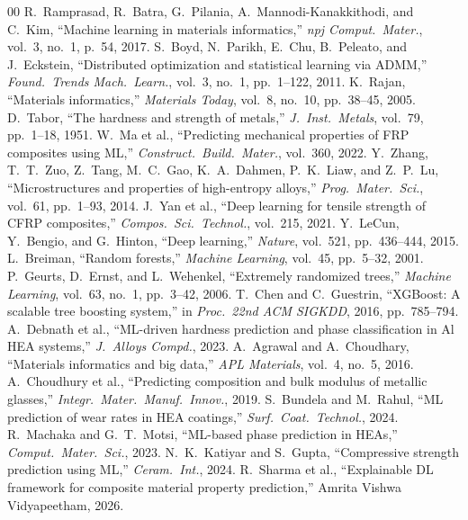 \documentclass[conference]{IEEEtran}
\begin{document}
\begin{thebibliography}{00}
 R.~Ramprasad, R.~Batra, G.~Pilania, A.~Mannodi-Kanakkithodi, and C.~Kim, ``Machine learning in materials informatics,'' \textit{npj Comput.\ Mater.}, vol.~3, no.~1, p.~54, 2017.
 S.~Boyd, N.~Parikh, E.~Chu, B.~Peleato, and J.~Eckstein, ``Distributed optimization and statistical learning via ADMM,'' \textit{Found.\ Trends Mach.\ Learn.}, vol.~3, no.~1, pp.~1--122, 2011.
 K.~Rajan, ``Materials informatics,'' \textit{Materials Today}, vol.~8, no.~10, pp.~38--45, 2005.
 D.~Tabor, ``The hardness and strength of metals,'' \textit{J.\ Inst.\ Metals}, vol.~79, pp.~1--18, 1951.
 W.~Ma et al., ``Predicting mechanical properties of FRP composites using ML,'' \textit{Construct.\ Build.\ Mater.}, vol.~360, 2022.
 Y.~Zhang, T.~T.~Zuo, Z.~Tang, M.~C.~Gao, K.~A.~Dahmen, P.~K.~Liaw, and Z.~P.~Lu, ``Microstructures and properties of high-entropy alloys,'' \textit{Prog.\ Mater.\ Sci.}, vol.~61, pp.~1--93, 2014.
 J.~Yan et al., ``Deep learning for tensile strength of CFRP composites,'' \textit{Compos.\ Sci.\ Technol.}, vol.~215, 2021.
 Y.~LeCun, Y.~Bengio, and G.~Hinton, ``Deep learning,'' \textit{Nature}, vol.~521, pp.~436--444, 2015.
 L.~Breiman, ``Random forests,'' \textit{Machine Learning}, vol.~45, pp.~5--32, 2001.
 P.~Geurts, D.~Ernst, and L.~Wehenkel, ``Extremely randomized trees,'' \textit{Machine Learning}, vol.~63, no.~1, pp.~3--42, 2006.
 T.~Chen and C.~Guestrin, ``XGBoost: A scalable tree boosting system,'' in \textit{Proc.\ 22nd ACM SIGKDD}, 2016, pp.~785--794.
 A.~Debnath et al., ``ML-driven hardness prediction and phase classification in Al HEA systems,'' \textit{J.\ Alloys Compd.}, 2023.
 A.~Agrawal and A.~Choudhary, ``Materials informatics and big data,'' \textit{APL Materials}, vol.~4, no.~5, 2016.
 A.~Choudhury et al., ``Predicting composition and bulk modulus of metallic glasses,'' \textit{Integr.\ Mater.\ Manuf.\ Innov.}, 2019.
 S.~Bundela and M.~Rahul, ``ML prediction of wear rates in HEA coatings,'' \textit{Surf.\ Coat.\ Technol.}, 2024.
 R.~Machaka and G.~T.~Motsi, ``ML-based phase prediction in HEAs,'' \textit{Comput.\ Mater.\ Sci.}, 2023.
 N.~K.~Katiyar and S.~Gupta, ``Compressive strength prediction using ML,'' \textit{Ceram.\ Int.}, 2024.
 R.~Sharma et al., ``Explainable DL framework for composite material property prediction,'' Amrita Vishwa Vidyapeetham, 2026.
\end{thebibliography}
\end{document}
